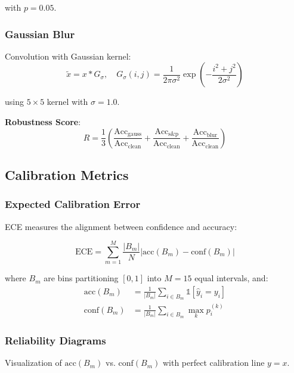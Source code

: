 with $p = 0.05$.

\subsubsection{Gaussian Blur}

Convolution with Gaussian kernel:
\begin{equation}
\tilde{x} = x \ast G_\sigma, \quad G_\sigma(i,j) = \frac{1}{2\pi\sigma^2}\exp\left(-\frac{i^2+j^2}{2\sigma^2}\right)
\end{equation}

using $5 \times 5$ kernel with $\sigma = 1.0$.

\textbf{Robustness Score}:
\begin{equation}
R = \frac{1}{3}\left(\frac{\text{Acc}_{\text{gauss}}}{\text{Acc}_{\text{clean}}} + \frac{\text{Acc}_{\text{s\&p}}}{\text{Acc}_{\text{clean}}} + \frac{\text{Acc}_{\text{blur}}}{\text{Acc}_{\text{clean}}}\right)
\end{equation}

\subsection{Calibration Metrics}

\subsubsection{Expected Calibration Error}

ECE measures the alignment between confidence and accuracy:

\begin{equation}
\text{ECE} = \sum_{m=1}^M \frac{|B_m|}{N} |\text{acc}(B_m) - \text{conf}(B_m)|
\end{equation}

where $B_m$ are bins partitioning $[0,1]$ into $M=15$ equal intervals, and:
\begin{align}
\text{acc}(B_m) &= \frac{1}{|B_m|}\sum_{i \in B_m} \mathbb{1}[\hat{y}_i = y_i] \\
\text{conf}(B_m) &= \frac{1}{|B_m|}\sum_{i \in B_m} \max_k p_i^{(k)}
\end{align}

\subsubsection{Reliability Diagrams}

Visualization of $\text{acc}(B_m)$ vs. $\text{conf}(B_m)$ with perfect calibration line $y=x$.

